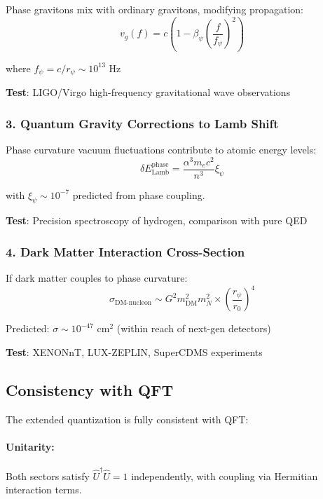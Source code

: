 \documentclass[12pt]{article}
\begin{document}
Phase gravitons mix with ordinary gravitons, modifying propagation:
\begin{equation}
    v_g(f) = c\left(1 - \beta_\psi \left(\frac{f}{f_\psi}\right)^2\right)
\end{equation}

where $f_\psi = c/r_\psi \sim 10^{13}$ Hz

\textbf{Test}: LIGO/Virgo high-frequency gravitational wave observations

\subsubsection{3. Quantum Gravity Corrections to Lamb Shift}

Phase curvature vacuum fluctuations contribute to atomic energy levels:
\begin{equation}
    \delta E_{\text{Lamb}}^{\text{phase}} = \frac{\alpha^3 m_e c^2}{n^3} \xi_\psi
\end{equation}

with $\xi_\psi \sim 10^{-7}$ predicted from phase coupling.

\textbf{Test}: Precision spectroscopy of hydrogen, comparison with pure QED

\subsubsection{4. Dark Matter Interaction Cross-Section}

If dark matter couples to phase curvature:
\begin{equation}
    \sigma_{\text{DM-nucleon}} \sim G^2 m_{\text{DM}}^2 m_N^2 \times \left(\frac{r_\psi}{r_0}\right)^4
\end{equation}

Predicted: $\sigma \sim 10^{-47}$ cm$^2$ (within reach of next-gen detectors)

\textbf{Test}: XENONnT, LUX-ZEPLIN, SuperCDMS experiments

\subsection{Consistency with QFT}

The extended quantization is fully consistent with QFT:

\paragraph{Unitarity:} Both sectors satisfy $\hat{U}^\dagger\hat{U} = 1$ independently, with coupling via Hermitian interaction terms.
\end{document}

